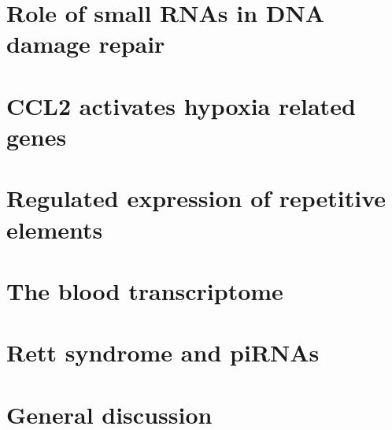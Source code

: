 \documentclass[11pt,a4paper]{report}
\begin{document}
\chapter{Role of small RNAs in DNA damage repair}



\chapter{CCL2 activates hypoxia related genes}


\chapter{Regulated expression of repetitive elements}


\chapter{The blood transcriptome}


\chapter{Rett syndrome and piRNAs}



%

\chapter{General discussion}




\end{document}
